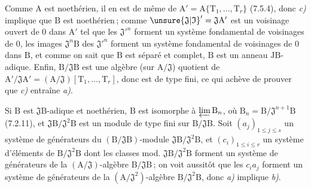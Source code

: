 Comme $\mathrm{A}$ est noethérien, il en est de même de $\mathrm{A}'=\mathrm{A}\{\mathrm{T}_1,\ldots,\mathrm{T}_r\}$ (7.5.4), donc \textit{c)} implique que $\mathrm{B}$ est noethérien\,; comme $\unsure{\mathfrak{J}|\mathfrak{I}}'=\mathfrak{J}\mathrm{A}'$ est un voisinage ouvert de $0$ dans $\mathrm{A}'$ tel que les ${\mathfrak{J}'}^{n}$ forment un système fondamental de voisinages de $0$, les images $\mathfrak{J}^{n}\mathrm{B}$ des ${\mathfrak{J}'}^{n}$ forment un système fondamental de voisinages de $0$ dans $\mathrm{B}$, et comme on sait que $\mathrm{B}$ est séparé et complet, $\mathrm{B}$ est un anneau $\mathrm{J}\mathrm{B}$-adique. Enfin, $\mathrm{B}/\mathfrak{J}\mathrm{B}$ est une algèbre (sur $\mathrm{A}/\mathfrak{J}$) quotient de $\mathrm{A}'/\mathfrak{J}\mathrm{A}'=(\mathrm{A}/\mathfrak{J})[\mathrm{T}_1,\ldots,\mathrm{T}_r]$, donc est de type fini, ce qui achève de prouver que \textit{c)} entraîne \textit{a)}.

Si $\mathrm{B}$ est $\mathfrak{J}\mathrm{B}$-adique et noethérien, $\mathrm{B}$ est isomorphe à $\varprojlim \mathrm{B}_n$, où $\mathrm{B}_n=\mathrm{B}/\mathfrak{J}^{n+1}\mathrm{B}$ (7.2.11), et $\mathfrak{J}\mathrm{B}/\mathfrak{J}^2\mathrm{B}$ est un module de type fini sur $\mathrm{B}/\mathfrak{J}\mathrm{B}$. Soit $(a_j)_{1\leqslant j\leqslant s}$ un système de générateurs du $(\mathrm{B}/\mathfrak{J}\mathrm{B})$-module $\mathfrak{J}\mathrm{B}/\mathfrak{J}^2\mathrm{B}$, et $(c_i)_{1\leqslant i\leqslant r}$ un système d’éléments de $\mathrm{B}/\mathfrak{J}^2\mathrm{B}$ dont les classes mod. $\mathfrak{J}\mathrm{B}/\mathfrak{J}^2\mathrm{B}$ forment un système de générateurs de la $(\mathrm{A}/\mathfrak{J})$-algèbre $\mathrm{B}/\mathfrak{J}\mathrm{B}$\,; on voit aussitôt que les $c_i a_j$ forment un système de générateurs de la $(\mathrm{A}/\mathfrak{J}^2)$-algèbre $\mathrm{B}/\mathfrak{J}^2\mathrm{B}$, donc \textit{a)} implique \textit{b)}.

